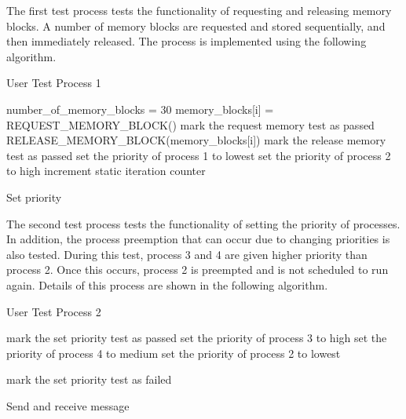 \documentclass[12pt]{report}
\begin{document}
\noindent The first test process tests the functionality of requesting and releasing memory blocks. A number of memory blocks are requested and stored sequentially, and then immediately released. The process is implemented using the following algorithm.
\begin{algorithm}
  \caption{User Test Process 1}
  \begin{algorithmic}[1]
      \State number\_of\_memory\_blocks = 30
        \State memory\_blocks[i] = REQUEST\_MEMORY\_BLOCK()
      \EndFor
      \State mark the request memory test as passed
        \State RELEASE\_MEMORY\_BLOCK(memory\_blocks[i])
      \EndFor
      \State mark the release memory test as passed
      \State set the priority of process 1 to lowest
      \State set the priority of process 2 to high
        \State increment static iteration counter
      \EndWhile
    \EndFunction
  \end{algorithmic}
\end{algorithm}

Set priority

\noindent The second test process tests the functionality of setting the priority of processes. In addition, the process preemption that can occur due to changing priorities is also tested. During this test, process 3 and 4 are given higher priority than process 2. Once this occurs, process 2 is preempted and is not scheduled to run again. Details of this process are shown in the following algorithm.
\begin{algorithm}
  \caption{User Test Process 2}
  \begin{algorithmic}[1]
      \State mark the set priority test as passed
      \State set the priority of process 3 to high
      \State set the priority of process 4 to medium
      \State set the priority of process 2 to lowest

      \State mark the set priority test as failed
      \EndWhile
    \EndFunction
  \end{algorithmic}
\end{algorithm}

Send and receive message
\end{document}
